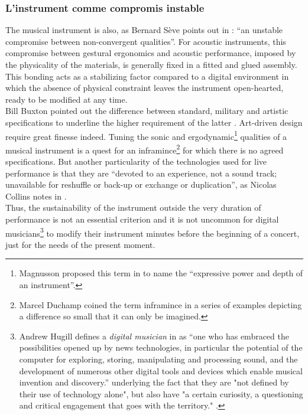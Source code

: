 \subsubsection{L'instrument comme compromis instable}
The musical instrument is also, as Bernard Sève points out in \cite{seve_instrument_2013}: “an unstable compromise between non-convergent qualities”. For acoustic instruments, this compromise between gestural ergonomics and acoustic performance, imposed by the physicality of the materials, is generally fixed in a fitted and glued assembly. This bonding acts as a stabilizing factor compared to a digital environment in which the absence of physical constraint leaves the instrument open-hearted, ready to be modified at any time.\\
\indent Bill Buxton pointed out the difference between standard, military and artistic specifications to underline the higher requirement of the latter \cite{buxton_artists_1997}. Art-driven design require great finesse indeed. Tuning the sonic and ergodynamic\footnote{Magnusson proposed this term in \cite{magnusson_ergodynamics_2019} to name the “expressive power and depth of an instrument”.} qualities of a musical instrument is a quest for an inframince\footnote{Marcel Duchamp \cite{duchamp_notes_2008} coined the term inframince in a series of examples depicting a difference so small that it can only be imagined.} for which there is no agreed specifications. But another particularity of the technologies used for live performance is that they are “devoted to an experience, not a sound track; unavailable for reshuffle or back-up or exchange or duplication”, as Nicolas Collins notes in \cite{collins_semiconducting_2013}.\\
\indent Thus, the sustainability of the instrument outside the very duration of performance is not an essential criterion and it is not uncommon for digital musicians\footnote{Andrew Hugill defines a \textit{digital musician} in \cite{hugill_digital_2019} as “one who has embraced the possibilities opened up by news technologies, in particular the potential of the computer for exploring, storing, manipulating and processing sound, and the development of numerous other digital tools and devices which enable musical invention and discovery.” underlying the fact that they are "not defined by their use of technology alone", but also have "a certain curiosity, a questioning and critical engagement that goes with the territory." .} to modify their instrument minutes before the beginning of a concert, just for the needs of the present moment.
	
